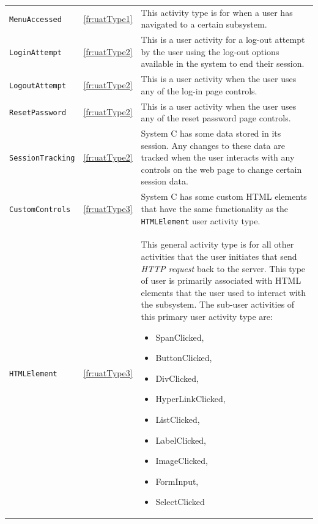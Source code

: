 \begin{xltabular}{\textwidth}{llX}
	\texttt{MenuAccessed} & \ref{fr:uatType1} & \RaggedRight This activity type is for when a user has navigated to a certain subsystem. \\ 
	\texttt{LoginAttempt} & \ref{fr:uatType2} & \RaggedRight This is a user activity for a log-out attempt by the user using the log-out options available in the system to end their session. \\ 
	\texttt{LogoutAttempt} & \ref{fr:uatType2} & \RaggedRight This is a user activity when the user uses any of the log-in page controls. \\
	\texttt{ResetPassword} & \ref{fr:uatType2} & \RaggedRight This is a user activity when the user uses any of the reset password page controls. \\
	\texttt{SessionTracking} & \ref{fr:uatType2} & \RaggedRight System C has some data stored in its session. Any changes to these data are tracked when the user interacts with any controls on the web page to change certain session data. \\
	\texttt{CustomControls} & \ref{fr:uatType3} & \RaggedRight System C has some custom HTML elements that have the same functionality as the \texttt{HTMLElement} user activity type. \\ 
	\texttt{HTMLElement} & \ref{fr:uatType3} & \RaggedRight This general activity type is for all other activities that the user initiates that send \textit{HTTP request} back to the server. This type of user is primarily associated with HTML elements that the user used to interact with the subsystem. The sub-user activities of this primary user activity type are: \begin{itemize}
		\item SpanClicked,
		\item ButtonClicked, 
		\item DivClicked, 
		\item HyperLinkClicked,
		\item ListClicked, 
		\item LabelClicked, 
		\item ImageClicked, 
		\item FormInput, 
		\item SelectClicked
	\end{itemize} \\
	\bottomrule
\end{xltabular}

